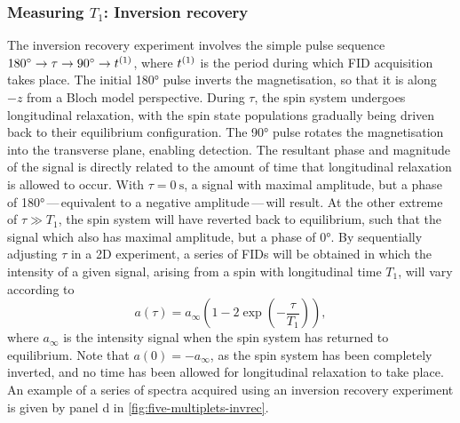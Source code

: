 \subsubsection{Measuring $T_1$: Inversion recovery}
\label{subsec:invrec}
The inversion recovery experiment involves the simple pulse sequence $\ang{180}
\rightarrow \tau \rightarrow \ang{90} \rightarrow t^{(1)}$, where $t^{(1)}$ is the
period during which \ac{FID} acquisition takes place. The initial
\ang{180} pulse inverts the magnetisation, so that it is along $-z$ from a
Bloch model perspective. During $\tau$, the spin system undergoes longitudinal
relaxation, with the spin state populations gradually being driven back to
their equilibrium configuration. The \ang{90} pulse rotates the magnetisation
into the transverse plane, enabling detection. The resultant phase and
magnitude of the signal is directly related to the amount of time that
longitudinal relaxation is allowed to occur. With $\tau = \qty{0}{\second}$, a
signal with maximal amplitude, but a phase of \ang{180}\,---\,equivalent to a
negative amplitude\,---\,will result. At the other extreme of $\tau \gg T_1$,
the spin system will have reverted
back to equilibrium, such that the signal which also has maximal amplitude, but a
phase of \ang{0}. By sequentially adjusting $\tau$ in a
\ac{2D} experiment, a series of \acp{FID} will be obtained in which the intensity
of a given signal, arising from a spin with longitudinal time $T_1$, will vary
according to
\begin{equation}
    a\left(\tau\right) = a_{\infty} \left( 1 - 2 \exp\left( -\frac{\tau}{T_1}\right) \right),
\end{equation}
where $a_{\infty}$ is the intensity signal when the spin system
has returned to equilibrium. Note that $a(0) = -a_{\infty}$, as the spin system
has been completely inverted, and no time has been allowed for longitudinal
relaxation to take place. An example of a series of spectra acquired using an
inversion recovery experiment is given by panel d in
\cref{fig:five-multiplets-invrec}.

